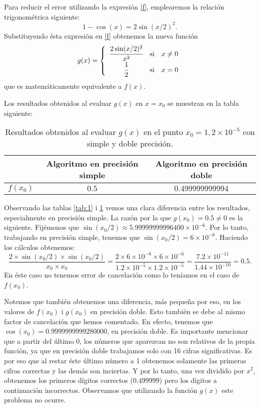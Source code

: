 \documentclass[a4paper]{article}
\begin{document}
Para reducir el error utilizando la expresión \eqref{f}, emplearemos la relación trigonométrica siguiente: $$1-\cos(x)=2\sin(x/2)^2.$$ Substituyendo ésta expresión en \eqref{f} obtenemos la nueva función
\begin{equation}
g(x)=\left\{\begin{array}{ccc}
    \cfrac{2\sin(x/2)^2}{x^2} & \text{si} & x\ne 0 \\
    \cfrac{1}{2} & \text{si} & x=0 
\end{array}\right.
\label{g}
\end{equation}
que es matemáticamente equivalente a $f(x)$.\par Los resultados obtenidos al evaluar $g(x)$ en $x=x_0$ se muestran en la tabla siguiente:\par
\begin{table}[ht]
    \centering
    \begin{tabular}{|c|c|c|}
        \hline
         & Algoritmo en precisión simple & Algoritmo en precisión doble \\
         \hline
         $f(x_0)$ & $0.5$ & $0.499999999994$\\
         \hline
    \end{tabular}
    \caption{Resultados obtenidos al evaluar $g(x)$ en el punto $x_0=1,2\times10^{-5}$ con simple y doble precisión.}
    \label{tab:2}
\end{table}
Observando las tablas \ref{tab:1} i \ref{tab:2} vemos una clara diferencia entre los resultados, especialmente en precisión simple. La razón por la que $g(x_0)=0.5\ne0$ es la siguiente. Fijémonos que $\sin(x_0/2)\approx5.99999999996400\times 10^{-6}$. Por lo tanto, trabajando en precisión simple, tenemos que $\sin(x_0/2)=6\times 10^{-6}$. Haciendo los cálculos obtenemos:
$$\frac{2\times\sin(x_0/2)\times\sin(x_0/2)}{x_0\times x_0}=\frac{2\times 6\times 10^{-6}\times 6\times 10^{-6}}{1.2\times 10^{-5}\times 1.2\times 10^{-5}}=\frac{7.2\times 10^{-11}}{1.44\times 10^{-10}}=0.5.$$
En éste caso no tenemos error de cancelación como lo teníamos en el caso de $f(x_0)$.\par
Notemos que también obtenemos una diferencia, más pequeña por eso, en los valores de $f(x_0)$ i $g(x_0)$ en precisión doble. Esto también se debe al mismo factor de cancelación que hemos comentado. En efecto, tenemos que $\cos(x_0)=0.9999999999280000$, en precisión doble. Es importante mencionar que a partir del último 0, los números que aparezcan no son relativos de la propia función, ya que en precisión doble trabajamos solo con 16 cifras significativas. Es por eso que al restar éste último número a 1 obtenemos solamente las primeras cifras correctas y las demás son inciertas. Y por lo tanto, una vez dividido por $x^2$, obtenemos los primeros dígitos correctos ($0.499999$) pero los dígitos a continuación incorrectos. Observamos que utilizando la función $g(x)$ este problema no ocurre.
\newpage
\end{document}
